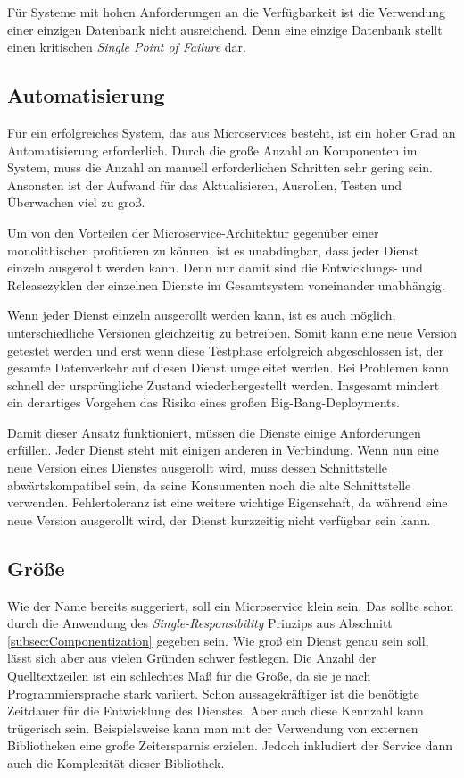 Für Systeme mit hohen Anforderungen an die Verfügbarkeit ist die Verwendung einer einzigen Datenbank nicht ausreichend. Denn eine einzige Datenbank stellt einen kritischen \textit{Single Point of Failure} dar.

\subsection{Automatisierung}

Für ein erfolgreiches System, das aus Microservices besteht, ist ein hoher Grad an Automatisierung erforderlich. Durch die große Anzahl an Komponenten im System, muss die Anzahl an manuell erforderlichen Schritten sehr gering sein. Ansonsten ist der Aufwand für das Aktualisieren, Ausrollen, Testen und Überwachen viel zu groß.

Um von den Vorteilen der Microservice-Architektur gegenüber einer monolithischen profitieren zu können, ist es unabdingbar, dass jeder Dienst einzeln ausgerollt werden kann. Denn nur damit sind die Entwicklungs- und Releasezyklen der einzelnen Dienste im Gesamtsystem voneinander unabhängig.

Wenn jeder Dienst einzeln ausgerollt werden kann, ist es auch möglich, unterschiedliche Versionen gleichzeitig zu betreiben. Somit kann eine neue Version getestet werden und erst wenn diese Testphase erfolgreich abgeschlossen ist, der gesamte Datenverkehr auf diesen Dienst umgeleitet werden. Bei Problemen kann schnell der ursprüngliche Zustand wiederhergestellt werden. Insgesamt mindert ein derartiges Vorgehen das Risiko eines großen Big-Bang-Deployments.

Damit dieser Ansatz funktioniert, müssen die Dienste einige Anforderungen erfüllen. Jeder Dienst steht mit einigen anderen in Verbindung. Wenn nun eine neue Version eines Dienstes ausgerollt wird, muss dessen Schnittstelle abwärtskompatibel sein, da seine Konsumenten noch die alte Schnittstelle verwenden. Fehlertoleranz ist eine weitere wichtige Eigenschaft, da während eine neue Version ausgerollt wird, der Dienst kurzzeitig nicht verfügbar sein kann.

\subsection{Größe}

Wie der Name bereits suggeriert, soll ein Microservice klein sein. Das sollte schon durch die Anwendung des \textit{Single-Responsibility} Prinzips aus Abschnitt \ref{subsec:Componentization} gegeben sein. Wie groß ein Dienst genau sein soll, lässt sich aber aus vielen Gründen schwer festlegen. Die Anzahl der Quelltextzeilen ist ein schlechtes Maß für die Größe, da sie je nach Programmiersprache stark variiert. Schon aussagekräftiger ist die benötigte Zeitdauer für die Entwicklung des Dienstes. Aber auch diese Kennzahl kann trügerisch sein. Beispielsweise kann man mit der Verwendung von externen Bibliotheken eine große Zeitersparnis erzielen. Jedoch inkludiert der Service dann auch die Komplexität dieser Bibliothek.

